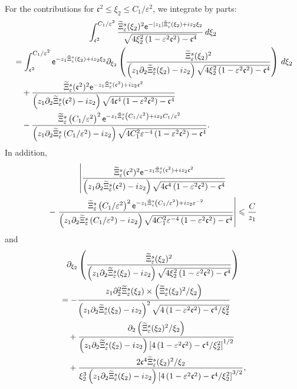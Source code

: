 \documentclass[AHL,Unicode,longabstracts,published]{cedram}
\newcommand*\p{\partial}
\newcommand*\ex{{\sf e}}
\newcommand*\cs{{\mathfrak c}}
\newcommand*\ls{\leqslant }
\newcommand*\e{\varepsilon}
\renewcommand*\t{\tilde}
\let\oldtilde\tilde
\renewcommand*{\tilde}[1]{\mathchoice{\widetilde{#1}}{\widetilde{#1}}{\oldtilde{#1}}{\oldtilde{#1}}}
\begin{document}
For the contributions for $ \cs^2 \ls \xi_2 \ls C_1 /\e^{2} $, we integrate by parts:
\begin{multline}\label{K111_zero_IPP}
\int_{ \cs^2 }^{ C_1 / \e^{2} } \frac{ \t\Xi_\e^s (\xi_2)^2 \ex^{- |z_1| \t\Xi_\e^s (\xi_2) + i z_2 \xi_2} }{
\sqrt{ 4 \xi_2^2 \left(1 - \e^2 \cs^2\right) - \cs^4 } } \, d\xi_2
\\
\begin{aligned}
&= \int_{ \cs^2 }^{ C_1 /\e^{2} } \ex^{- z_1 \t\Xi_\e^s (\xi_2) + i z_2 \xi_2}
\p_{\xi_2} \left(\frac{ \t\Xi_\e^s (\xi_2)^2 }{ \left(z_1 \p_2 \t\Xi_\e^s (\xi_2) - i z_2\right) \sqrt{ 4 \xi_2^2 \left(1 - \e^2 \cs^2\right) - \cs^4 } } \right) \, d\xi_2
\\ & \quad + \frac{ \t\Xi_\e^s (\cs^2)^2 \ex^{- z_1 \t\Xi_\e^s (\cs^2) + i z_2 \cs^2} }{\left(z_1 \p_2 \t\Xi_\e^s (\cs^2) - i z_2\right) \sqrt{ 4 \cs^4 \left(1 - \e^2 \cs^2\right) - \cs^4 } }\\
& \quad - \frac{ \t\Xi_\e^s \left(C_1/ \e^{2}\right)^2 \ex^{- z_1 \t\Xi_\e^s \left(C_1 / \e^{2}\right) + i z_2 C_1 / \e^{2}}}{\left(z_1 \p_2 \t\Xi_\e^s \left(C_1 / \e^{2}\right) - i z_2\right) \sqrt{ 4 C_1^2 \e^{-4} \left(1 - \e^2 \cs^2\right) - \cs^4}}.
\end{aligned}
\end{multline}
In addition,
\begin{multline*}
\left\lvert  \frac{ \t\Xi_\e^s (\cs^2)^2 \ex^{- z_1 \t\Xi_\e^s (\cs^2) + i z_2 \cs^2} }{\left(z_1 \p_2 \t\Xi_\e^s (\cs^2) - i z_2\right) \sqrt{4 \cs^4 \left(1 - \e^2 \cs^2\right) - \cs^4}}\right.
\\ -\left. \frac{\t\Xi_\e^s \left(C_1 / \e^{2}\right)^2 \ex^{- z_1 \t\Xi_\e^s \left(C_1 / \e^{2}\right) + i z_2 \e^{-2}}}{\left(z_1 \p_2 \t\Xi_\e^s \left(C_1 / \e^{2}\right) - i z_2\right) \sqrt{4 C_1^2 \e^{-4}\left(1 - \e^2 \cs^2\right) - \cs^4}}
\right\rvert
\ls \frac{C}{z_1}
\end{multline*}
and
\begin{multline}\label{IPP_K111}
\p_{\xi_2} \left(\frac{ \t\Xi_\e^s (\xi_2)^2 }{\left(z_1 \p_2 \t\Xi_\e^s (\xi_2) - i z_2\right) \sqrt{ 4 \xi_2^2 \left(1 - \e^2 \cs^2\right) - \cs^4}} \right)
\\
\begin{aligned}
& = - \frac{ z_1 \p_2^2 \t\Xi_\e^s (\xi_2) \times \left(\t\Xi_\e^s (\xi_2)^2 / \xi_2\right)}{\left(z_1 \p_2 \t\Xi_\e^s (\xi_2) - i z_2\right)^2 \sqrt{4\left(1 - \e^2 \cs^2\right) - \cs^4 /\xi_2^2}}
\\
& \quad + \frac{ \p_2 \left(\t\Xi_\e^s (\xi_2)^2 / \xi_2\right)}{\left(z_1 \p_2 \t\Xi_\e^s (\xi_2) - i z_2\right)\left[4\left(1 - \e^2 \cs^2\right) - \cs^4 /\xi_2^2\right]^{1/2}}
\\
& \quad + \frac{ 2 \cs^4 \t\Xi_\e^s (\xi_2)^2 / \xi_2}{\xi_2^3 \left(z_1 \p_2 \t\Xi_\e^s (\xi_2) - i z_2\right)\left[4\left(1 - \e^2 \cs^2\right) - \cs^4 /\xi_2^2\right]^{3/2}},
\end{aligned}
\end{multline}
\end{document}
